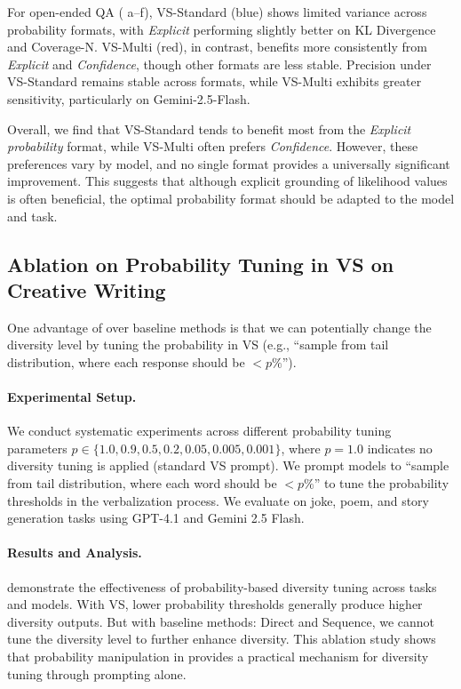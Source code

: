 For open-ended QA ( a–f), VS-Standard (blue) shows limited variance across probability formats, with \textit{Explicit} performing slightly better on KL Divergence and Coverage-N. VS-Multi (red), in contrast, benefits more consistently from \textit{Explicit} and \textit{Confidence}, though other formats are less stable. Precision under VS-Standard remains stable across formats, while VS-Multi exhibits greater sensitivity, particularly on Gemini-2.5-Flash. 

Overall, we find that VS-Standard tends to benefit most from the \textit{Explicit probability} format, while VS-Multi often prefers \textit{Confidence}. However, these preferences vary by model, and no single format provides a universally significant improvement. This suggests that although explicit grounding of likelihood values is often beneficial, the optimal probability format should be adapted to the model and task. 


\newpage
\subsection{Ablation on Probability Tuning in VS on Creative Writing} \label{sec:ablation_diversity_tuning_creativity}

One advantage of \ours over baseline methods is that we can potentially change the diversity level by tuning the probability in VS (e.g., ``sample from tail distribution, where each response should be $< p\%$'').

\paragraph{Experimental Setup.}
We conduct systematic experiments across different probability tuning parameters $p \in \{1.0, 0.9, 0.5, 0.2, 0.05, 0.005, 0.001\}$, where $p = 1.0$ indicates no diversity tuning is applied (standard VS prompt). We prompt models to ``sample from tail distribution, where each word should be $< p\%$'' to tune the probability thresholds in the verbalization process. We evaluate \ours on joke, poem, and story generation tasks using GPT-4.1 and Gemini 2.5 Flash.

\paragraph{Results and Analysis.}
 demonstrate the effectiveness of probability-based diversity tuning across tasks and models. With VS, lower probability thresholds generally produce higher diversity outputs. But with baseline methods: Direct and Sequence, we cannot tune the diversity level to further enhance diversity. This ablation study shows that probability manipulation in \ours provides a practical mechanism for diversity tuning through prompting alone.


